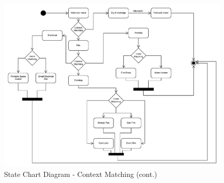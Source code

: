 \documentclass{scrreprt}
\begin{document}
\begin{figure}[ht!]
    \centering
    \includegraphics[angle=90, width=.95\textwidth]{img3/state2.pdf}
    \caption{State Chart Diagram - Context Matching (cont.)}
    \label{fig:statechartdiagram2}
\end{figure}
\end{document}

